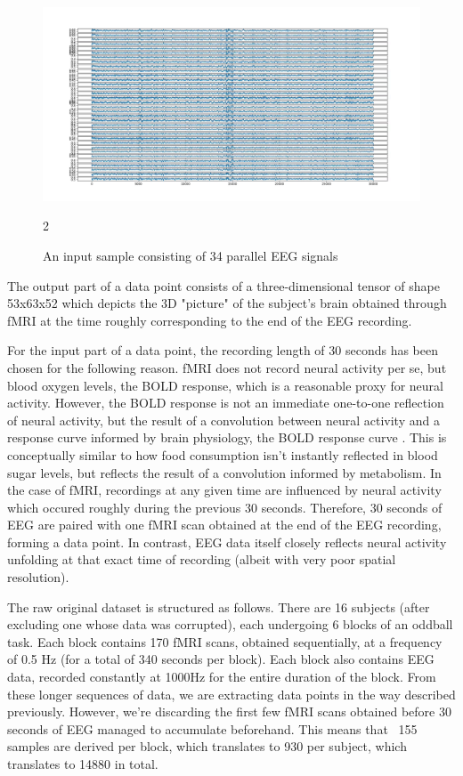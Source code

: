 \documentclass{article}
\begin{document}
\begin{figure}[h]
    \centering
    \includegraphics[width=\textwidth]{eeg.png}
    \caption{An input sample consisting of 34 parallel EEG signals}
2\end{figure}

The output part of a data point consists of a three-dimensional tensor of shape 53x63x52 which depicts the 3D "picture" of the subject's brain obtained through fMRI at the time roughly corresponding to the end of the EEG recording.

For the input part of a data point, the recording length of 30 seconds has been chosen for the following reason. fMRI does not record neural activity per se, but blood oxygen levels, the BOLD response, which is a reasonable proxy for neural activity. However, the BOLD response is not an immediate one-to-one reflection of neural activity, but the result of a convolution between neural activity and a response curve informed by brain physiology, the BOLD response curve \cite{noauthor_functional_1993}. This is conceptually similar to how food consumption isn't instantly reflected in blood sugar levels, but reflects the result of a convolution informed by metabolism. In the case of fMRI, recordings at any given time are influenced by neural activity which occured roughly during the previous 30 seconds. Therefore, 30 seconds of EEG are paired with one fMRI scan obtained at the end of the EEG recording, forming a data point. In contrast, EEG data itself closely reflects neural activity unfolding at that exact time of recording (albeit with very poor spatial resolution).

The raw original dataset is structured as follows. There are 16 subjects (after excluding one whose data was corrupted), each undergoing 6 blocks of an oddball task. Each block contains 170 fMRI scans, obtained sequentially, at a frequency of 0.5 Hz (for a total of 340 seconds per block). Each block also contains EEG data, recorded constantly at 1000Hz for the entire duration of the block. From these longer sequences of data, we are extracting data points in the way described previously. However, we're discarding the first few fMRI scans obtained before 30 seconds of EEG managed to accumulate beforehand. This means that ~155 samples are derived per block, which translates to 930 per subject, which translates to 14880 in total.
\end{document}
